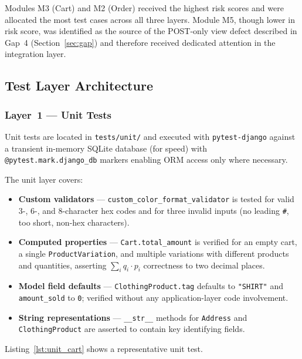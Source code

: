 \documentclass[12pt, a4paper]{article}
\begin{document}
Modules M3 (Cart) and M2 (Order) received the highest risk scores and were
allocated the most test cases across all three layers.  Module M5, though lower
in risk score, was identified as the source of the POST-only view defect
described in Gap~4 (Section~\ref{sec:gap}) and therefore received dedicated
attention in the integration layer.

\subsection{Test Layer Architecture}
\label{sec:layers}

\subsubsection{Layer~1 — Unit Tests}

Unit tests are located in \texttt{tests/unit/} and executed with
\texttt{pytest-django} against a transient in-memory SQLite database (for speed)
with \texttt{@pytest.mark.django\_db} markers enabling ORM access only where
necessary.

The unit layer covers:
\begin{itemize}
    \item \textbf{Custom validators} — \texttt{custom\_color\_format\_validator}
    is tested for valid 3-, 6-, and 8-character hex codes and for three invalid
    inputs (no leading \texttt{\#}, too short, non-hex characters).
    \item \textbf{Computed properties} — \texttt{Cart.total\_amount} is verified
    for an empty cart, a single \texttt{ProductVariation}, and multiple
    variations with different products and quantities, asserting
    $\sum_i q_i \cdot p_i$ correctness to two decimal places.
    \item \textbf{Model field defaults} — \texttt{ClothingProduct.tag} defaults
    to \texttt{"SHIRT"} and \texttt{amount\_sold} to \texttt{0}; verified
    without any application-layer code involvement.
    \item \textbf{String representations} — \texttt{\_\_str\_\_} methods for
    \texttt{Address} and \texttt{ClothingProduct} are asserted to contain
    key identifying fields.
\end{itemize}

Listing~\ref{lst:unit_cart} shows a representative unit test.
\end{document}
